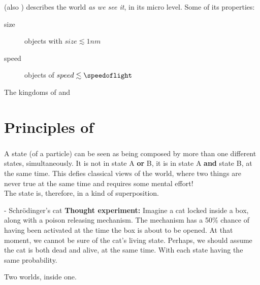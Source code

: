 \documentclass[aspectratio=43]{beamer}
\begin{document}
\begin{frame}{\qp}
\begin{card}
    \qp (also \qm) describes the world \textit{as we see it}, in its micro level. Some of its properties:
    \begin{description}
        \item[size] objects with $size \lesssim 1nm$
        \item[speed] objects of $speed \lesssim \speedoflight$
    \end{description}
\end{card}
\pagenumber
\end{frame}

\begin{frame}{The kingdoms of \cl and \qm}
\begin{card}
    \centering{}
\end{card}
\pagenumber
\end{frame}

\section{Principles of \qm}
\subsubsection{\qsp}
\begin{frame}{\qsp}
    \begin{card}
        A \q state (of a particle) can be seen as being composed by more than one different states, simultaneously. It is not in state A \textbf{or} B, it is in state A \textbf{and} state B, at the same time. This defies classical views of the world, where two things are never true at the same time and requires some mental effort!\\
        The state is, therefore, in a kind of superposition.
    \end{card}
\pagenumber
\end{frame}

\begin{frame}{\qsp - Schrödinger's cat}
    \textbf{Thought experiment:} Imagine a cat locked inside a box, along with a poison releasing mechanism. The mechanism has a 50\% chance of having been activated at the time the box is about to be opened. At that moment, we cannot be sure of the cat's living state. Perhaps, we should assume the cat is both dead and alive, at the same time. With each state having the same probability.
    \begin{center}
    \end{center}
    \begin{center}
        Two worlds, inside one.
    \end{center}
\pagenumber
\end{frame}
\end{document}
